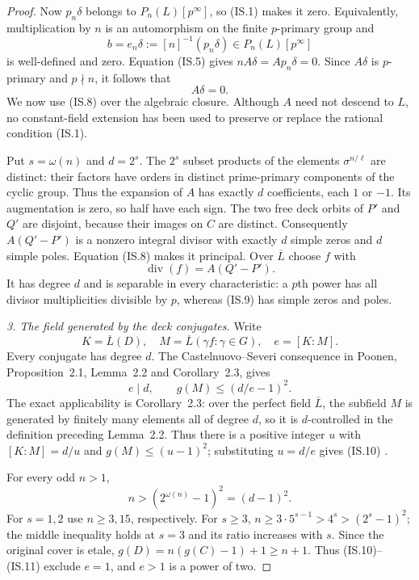 \documentclass[11pt,a4paper]{article}
\begin{document}
\begin{proof}
Now $p_n\delta$ belongs to $P_n(L)[p^\infty]$, so (IS.1)
makes it zero. Equivalently, multiplication by $n$ is an
automorphism on the finite $p$-primary group and
\[
 b=e_n\delta:=[n]^{-1}(p_n\delta)
                      \in P_n(L)[p^\infty]
 \tag{IS.7}
\]
is well-defined and zero. Equation (IS.5) gives
$nA\delta=Ap_n\delta=0$. Since $A\delta$ is $p$-primary and
$p\nmid n$, it follows that
\[
                               A\delta=0.
 \tag{IS.8}
\]
We now use (IS.8) over the algebraic closure. Although $A$ need
not descend to $L$, no constant-field extension has been used
to preserve or replace the rational condition (IS.1).

Put $s=\omega(n)$ and $d=2^s$. The $2^s$ subset products of the
elements $\sigma^{n/\ell}$ are distinct: their factors have
orders in distinct prime-primary components of the cyclic
group. Thus the expansion of $A$ has exactly $d$ coefficients,
each $1$ or $-1$. Its augmentation is zero, so half have each
sign. The two free deck orbits of $P'$ and $Q'$ are disjoint,
because their images on $C$ are distinct. Consequently
$A(Q'-P')$ is a nonzero integral divisor with exactly $d$
simple zeros and $d$ simple poles. Equation (IS.8) makes it
principal. Over $\overline L$ choose $f$ with
\[
                       \operatorname{div}(f)=A(Q'-P').
 \tag{IS.9}
\]
It has degree $d$ and is separable in every characteristic:
a $p$th power has all divisor multiplicities divisible by $p$,
whereas (IS.9) has simple zeros and poles.

\emph{3. The field generated by the deck conjugates.}
Write
\[
 K=\overline L(D),\quad
 M=\overline L(\gamma f:\gamma\in G),\quad e=[K:M].
\]
Every conjugate has degree $d$. The Castelnuovo--Severi
consequence in Poonen, Proposition~2.1, Lemma~2.2 and
Corollary~2.3, gives
\[
                    e\mid d,
                    \qquad g(M)\le(d/e-1)^2.
 \tag{IS.10}
\]
The exact applicability is Corollary~2.3: over the perfect field
$\overline L$, the subfield $M$ is generated by finitely many
elements all of degree $d$, so it is $d$-controlled in the
definition preceding Lemma~2.2. Thus there is a positive integer
$u$ with $[K:M]=d/u$ and $g(M)\le(u-1)^2$; substituting
$u=d/e$ gives (IS.10)
\cite[Proposition~2.1, Lemma~2.2 and Corollary~2.3]{Poonen2007Gonality}.

For every odd $n>1$,
\[
                         n>(2^{\omega(n)}-1)^2=(d-1)^2.
 \tag{IS.11}
\]
For $s=1,2$ use $n\ge3,15$, respectively. For $s\ge3$,
$n\ge3\cdot5^{s-1}>4^s>(2^s-1)^2$; the middle inequality
holds at $s=3$ and its ratio increases with $s$.
Since the original cover is etale,
$g(D)=n(g(C)-1)+1\ge n+1$.
Thus (IS.10)--(IS.11) exclude $e=1$, and $e>1$ is a power of two.


\end{proof}
\end{document}
